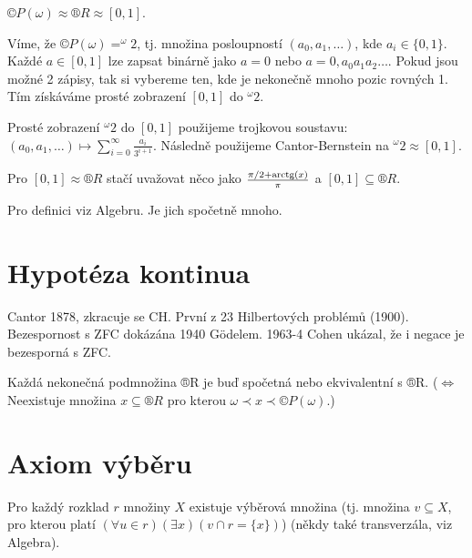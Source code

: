 \documentclass[12pt]{article}                   %
\begin{document}
    \begin{veta}
        $©P(\omega) \approx ®R \approx [0, 1]$.

        \begin{dukazin}
            Víme, že $©P(\omega) = ^\omega 2$, tj. množina posloupností $(a_0, a_1, …)$, kde $a_i \in \{0, 1\}$. Každé $a \in [0, 1]$ lze zapsat binárně jako $a = 0$ nebo $a = 0, a_0a_1a_2…$. Pokud jsou možné 2 zápisy, tak si vybereme ten, kde je nekonečně mnoho pozic rovných 1. Tím získáváme prosté zobrazení $[0, 1]$ do $^\omega 2$.

            Prosté zobrazení $^\omega 2$ do $[0,1]$ použijeme trojkovou soustavu: $(a_0, a_1, …) \mapsto \sum_{i=0}^∞ \frac{a_i}{3^{i+1}}$. Následně použijeme Cantor-Bernstein na $^\omega 2 \approx [0, 1]$.

            Pro $[0, 1] \approx ®R$ stačí uvažovat něco jako $\frac{\pi/2 + \operatorname{arctg}(x)}{\pi}$ a $[0, 1] \subseteq ®R$.
        \end{dukazin}
    \end{veta}

    \begin{poznamka}
        Pro definici viz Algebru. Je jich spočetně mnoho.
    \end{poznamka}


\section{Hypotéza kontinua}
    \begin{poznamka}[Historie]
        Cantor 1878, zkracuje se CH. První z 23 Hilbertových problémů (1900). Bezespornost s ZFC dokázána 1940 Gödelem. 1963-4 Cohen ukázal, že i negace je bezesporná s ZFC.
    \end{poznamka}

    \begin{definice}[CH]
        Každá nekonečná podmnožina ®R je buď spočetná nebo ekvivalentní s ®R. ($\Leftrightarrow$ Neexistuje množina $x \subseteq ®R$ pro kterou $\omega \prec x \prec ©P(\omega)$.)
    \end{definice}

\section{Axiom výběru}
    \begin{definice}
            Pro každý rozklad $r$ množiny $X$ existuje výběrová množina (tj. množina $v \subseteq X$, pro kterou platí $(\forall u \in r)(\exists x)(v \cap r = \{x\})$) (někdy také transverzála, viz Algebra).
    \end{definice}
\end{document}
